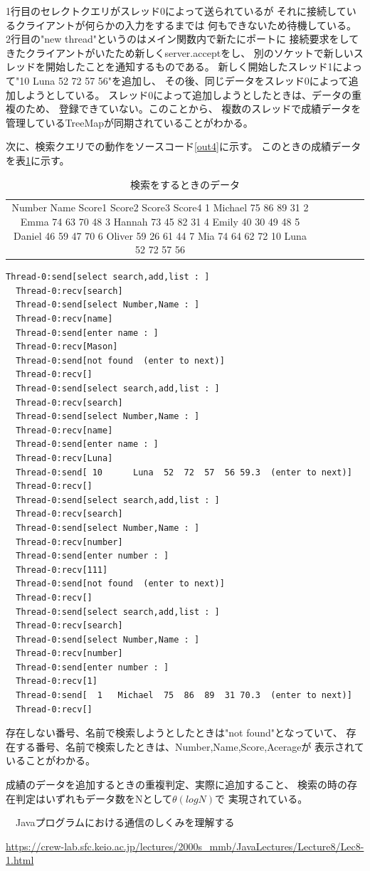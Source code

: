 \documentclass[dvipdfmx]{jsarticle}
\begin{document}
1行目のセレクトクエリがスレッド0によって送られているが
それに接続しているクライアントが何らかの入力をするまでは
何もできないため待機している。
2行目の"new thread"というのはメイン関数内で新たにポートに
接続要求をしてきたクライアントがいたため新しくserver.acceptをし、
別のソケットで新しいスレッドを開始したことを通知するものである。
新しく開始したスレッド1によって"10 Luna 52 72 57 56"を追加し、
その後、同じデータをスレッド0によって追加しようとしている。
スレッド0によって追加しようとしたときは、データの重複のため、
登録できていない。このことから、
複数のスレッドで成績データを管理しているTreeMapが同期されていることがわかる。

次に、検索クエリでの動作をソースコード\ref{out4}に示す。
このときの成績データを表\ref{data2}に示す。
\begin{table}[H]
  \begin{tabular}{cccccc}
    Number  Name  Score1  Score2  Score3  Score4
    1	Michael	75	86	89	31
    2	Emma	74	63	70	48
    3	Hannah	73	45	82	31
    4	Emily	40	30	49	48
    5	Daniel	46	59	47	70
    6	Oliver	59	26	61	44
    7	Mia	74	64	62	72
    10	Luna	52	72	57	56
  \end{tabular}
  \centering
  \caption{検索をするときのデータ}
  \label{data2}
\end{table}
\begin{lstlisting}[caption=検索クエリ,label=out4]
  Thread-0:send[select search,add,list : ]
  Thread-0:recv[search]
  Thread-0:send[select Number,Name : ]
  Thread-0:recv[name]
  Thread-0:send[enter name : ]
  Thread-0:recv[Mason]
  Thread-0:send[not found  (enter to next)]
  Thread-0:recv[]
  Thread-0:send[select search,add,list : ]
  Thread-0:recv[search]
  Thread-0:send[select Number,Name : ]
  Thread-0:recv[name]
  Thread-0:send[enter name : ]
  Thread-0:recv[Luna]
  Thread-0:send[ 10      Luna  52  72  57  56 59.3  (enter to next)]
  Thread-0:recv[]
  Thread-0:send[select search,add,list : ]
  Thread-0:recv[search]
  Thread-0:send[select Number,Name : ]
  Thread-0:recv[number]
  Thread-0:send[enter number : ]
  Thread-0:recv[111]
  Thread-0:send[not found  (enter to next)]
  Thread-0:recv[]
  Thread-0:send[select search,add,list : ]
  Thread-0:recv[search]
  Thread-0:send[select Number,Name : ]
  Thread-0:recv[number]
  Thread-0:send[enter number : ]
  Thread-0:recv[1]
  Thread-0:send[  1   Michael  75  86  89  31 70.3  (enter to next)]
  Thread-0:recv[]  
\end{lstlisting}

存在しない番号、名前で検索しようとしたときは"not found"となっていて、
存在する番号、名前で検索したときは、Number,Name,Score,Acerageが
表示されていることがわかる。

成績のデータを追加するときの重複判定、実際に追加すること、
検索の時の存在判定はいずれもデータ数をNとして$θ(logN)$で
実現されている。

\begin{thebibliography}{10}
  　Javaプログラムにおける通信のしくみを理解する

  \url{https://crew-lab.sfc.keio.ac.jp/lectures/2000s_mmb/JavaLectures/Lecture8/Lec8-1.html}
\end{thebibliography}
\end{document}
